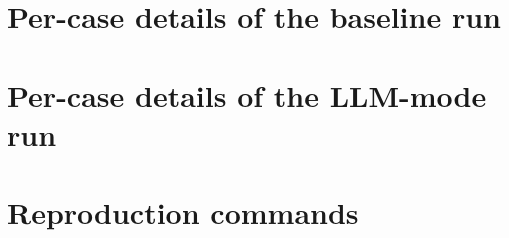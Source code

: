 \chapter{Per-case details of the baseline run}
\label{app:baseline}

\chapter{Per-case details of the LLM-mode run}
\label{app:llm}

\chapter{Reproduction commands}
\label{app:reproduce}

